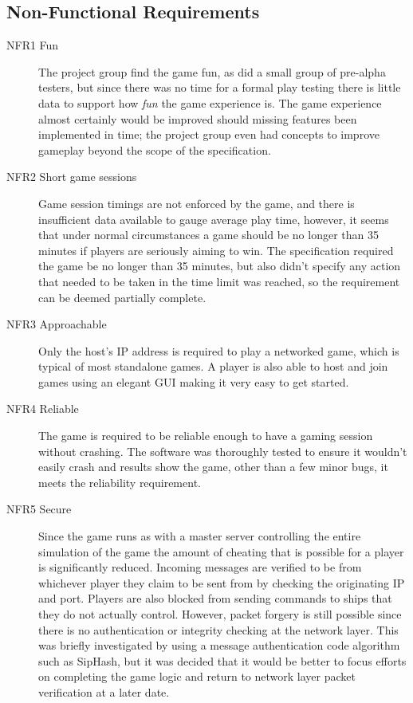 \subsection{Non-Functional Requirements}
\begin{description}
  \item[NFR1 Fun] The project group find the game fun, as did a small group of pre-alpha testers, but since there was no time for a formal play testing there is little data to support how \emph{fun} the game experience is. The game experience almost certainly would be improved should missing features been implemented in time; the project group even had concepts to improve gameplay beyond the scope of the specification.
    
  \item[NFR2 Short game sessions] Game session timings are not enforced by the game, and there is insufficient data available to gauge average play time, however, it seems that under normal circumstances a game should be no longer than 35 minutes if players are seriously aiming to win. The specification required the game be no longer than 35 minutes, but also didn't specify any action that needed to be taken in the time limit was reached, so the requirement can be deemed partially complete.

  \item[NFR3 Approachable] Only the host's IP address is required to play a networked game, which is typical of most standalone games. A player is also able to host and join games using an elegant GUI making it very easy to get started.

  \item[NFR4 Reliable] The game is required to be reliable enough to have a gaming session without crashing. The software was thoroughly tested to ensure it wouldn't easily crash and results show the game, other than a few minor bugs, it meets the reliability requirement.
  
  \item[NFR5 Secure] Since the game runs as with a master server controlling the entire simulation of the game the amount of cheating that is possible for a player is significantly reduced. Incoming messages are verified to be from whichever player they claim to be sent from by checking the originating IP and port. Players are also blocked from sending commands to ships that they do not actually control. However, packet forgery is still possible since there is no authentication or integrity checking at the network layer. This was briefly investigated by using a message authentication code algorithm such as SipHash,\cite{aumasson2012siphash} but it was decided that it would be better to focus efforts on completing the game logic and return to network layer packet verification at a later date.

\end{description}

